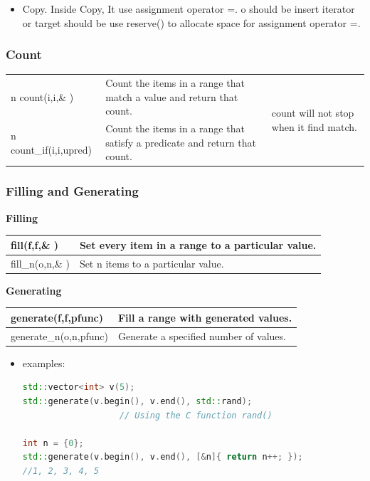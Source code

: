 \documentclass[a4paper,12pt,twoside]{book}
\begin{document}
\begin{itemize}
\item Copy.  Inside Copy, It use assignment operator =. o should be insert iterator or target should be use reserve() to allocate space for assignment operator =.
\end{itemize}



\subsubsection{Count}
\begin{tabular}{| p{} |p{}|p{}|}
\hline n count(i,i,\& ) & Count the items in a range that match a value and return that count.& \multirow{2}{*}{ \parbox{0.2\textwidth}{count will not stop when it find match. } }    \\
\cline{1-2} n count\_if(i,i,upred)  & Count the items in a range that satisfy a predicate and return that count. & \\
\hline
\end{tabular}


\subsubsection{Filling and Generating}
\textbf{Filling} \\
\begin{tabular}{| p{} |p{}|}
\hline fill(f,f,\& ) & Set every item in a range to a particular value.  \\
\hline fill\_n(o,n,\& )  & Set n items to a particular value.   \\
\hline
\end{tabular}


\textbf{Generating} \\
\begin{tabular}{| p{} |p{}|}
\hline generate(f,f,pfunc)  & Fill a range with generated values.   \\
\hline generate\_n(o,n,pfunc)  & Generate a specified number of values.   \\
\hline
\end{tabular}

\begin{itemize}
\item examples:
\begin{lstlisting}[frame=single, language=c++]
std::vector<int> v(5);
std::generate(v.begin(), v.end(), std::rand);
                   // Using the C function rand()

int n = {0};
std::generate(v.begin(), v.end(), [&n]{ return n++; });
//1, 2, 3, 4, 5
\end{lstlisting}

\end{itemize}
\end{document}
